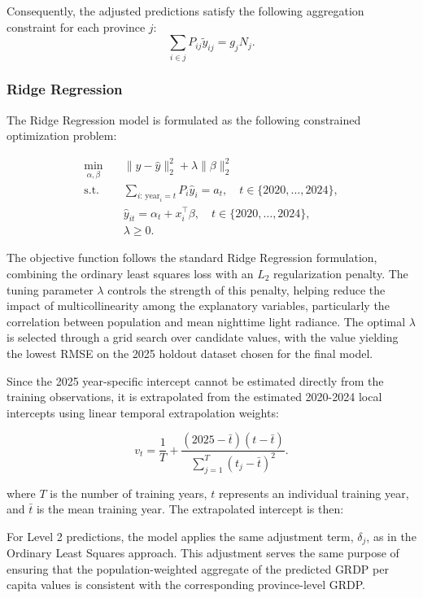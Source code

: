 \documentclass[11pt]{article} %
\begin{document}
Consequently, the adjusted predictions satisfy the following aggregation constraint for each province \(j\):
\[
\sum_{i\in j}P_{ij}\tilde{y}_{ij}=g_jN_j.
\]


\subsubsection{Ridge Regression}

The Ridge Regression model is formulated as the following constrained optimization problem:

\[
\begin{aligned}
\min_{\alpha,\beta}\quad
& \|y-\hat y\|_2^2+\lambda\|\beta\|_2^2\\
\text{s.t.}\quad
& \sum_{i:\,\mathrm{year}_i=t} P_i\hat y_i=a_t,
\quad t\in\{2020,\ldots,2024\},\\
& \hat y_{it}=\alpha_t+x_i^\top\beta,
\quad t\in\{2020,\ldots,2024\},\\
& \lambda\ge 0.
\end{aligned}
\]

The objective function follows the standard Ridge Regression formulation, combining the ordinary least squares loss with an \(L_2\) regularization penalty. The tuning parameter \(\lambda\) controls the strength of this penalty, helping reduce the impact of multicollinearity among the explanatory variables, particularly the correlation between population and mean nighttime light radiance. The optimal \(\lambda\) is selected through a grid search over candidate values, with the value yielding the lowest RMSE on the 2025 holdout dataset chosen for the final model.

Since the 2025 year-specific intercept cannot be estimated directly from the training observations, it is extrapolated from the estimated 2020-2024 local intercepts using linear temporal extrapolation weights:

\[
v_t = \frac{1}{T}
+ \frac{(2025-\bar{t})(t-\bar{t})}
{\sum_{j=1}^{T}(t_j-\bar{t})^2}.
\]

where \(T\) is the number of training years, \(t\) represents an individual training year, and \(\bar t\) is the mean training year. The extrapolated intercept is then:

For Level 2 predictions, the model applies the same adjustment term, \(\delta_j\), as in the Ordinary Least Squares approach. This adjustment serves the same purpose of ensuring that the population-weighted aggregate of the predicted GRDP per capita values is consistent with the corresponding province-level GRDP.
\end{document}
